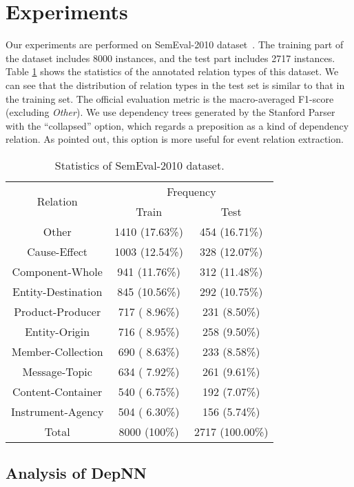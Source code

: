\documentclass[11pt]{article}
\begin{document}
\section{Experiments}
Our experiments are performed on SemEval-2010 dataset~\cite{5009814}.
The training part of the dataset  includes 8000 instances, and the test part includes 2717 instances.
Table \ref{tab:stat} shows the statistics of the annotated relation types of this dataset.
We can see that the distribution of relation types in the test set is similar to that in the training set.
 The official evaluation metric is the macro-averaged F1-score (excluding \textit{Other}).
We use dependency trees generated by the Stanford Parser \cite{443415} with the ``collapsed'' option, which regards a preposition as a kind of dependency relation. As  pointed out, this option is more useful for event relation extraction.
\begin{table}[htbp]
\center
\small
\begin{tabular}{|c|cc|}
\hline
\multirow{2}{*}{Relation}&
		\multicolumn{2}{c|}{Frequency}\\
		\cline{2-3}
		& Train & Test\\
\hline
Other&1410 (17.63\%)&454 (16.71\%)\\
Cause-Effect&1003 (12.54\%)&328 (12.07\%)\\
Component-Whole& 941 (11.76\%)&312 (11.48\%)\\
Entity-Destination& 845 (10.56\%)&292 (10.75\%)\\
Product-Producer& 717 ( 8.96\%)&231 (8.50\%)\\
Entity-Origin& 716 ( 8.95\%)&258 (9.50\%)\\
Member-Collection& 690 ( 8.63\%)&233 (8.58\%)\\
Message-Topic& 634 ( 7.92\%)&261 (9.61\%)\\
Content-Container& 540 ( 6.75\%)&192 (7.07\%)\\
Instrument-Agency& 504 ( 6.30\%)&156 (5.74\%)\\
\hhline{|===|}
Total&8000 (100\%)&2717 (100.00\%)\\
\hline
 \end{tabular}
 \caption{Statistics of SemEval-2010 dataset.}\label{tab:stat}
\end{table}



\subsection{Analysis of DepNN}
\end{document}
